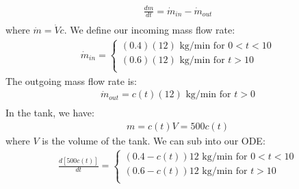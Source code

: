 \begin{exmp}{}
\begin{itemize}
\begin{align*}
 \frac{dm}{dt}=\dot{m}_{in}-\dot{m}_{out} \\ 
 \end{align*}
where $\dot{m}=\dot{V}c$. We define our incoming mass flow rate:
 \begin{align*}
 \dot{m}_{in}=
 \begin{cases}
 (0.4)(12) \text{ kg/min for }0<t<10\\
  (0.6)(12) \text{ kg/min for }t>10\\
 \end{cases}
\end{align*}
The outgoing mass flow rate is:
 \begin{align*}
 \dot{m}_{out}= c(t)(12) \text{ kg/min for } t>0\\
\end{align*}
In the tank, we have:
 \begin{align*}
m=c(t) V=500 c(t)
\end{align*}
where $V$ is the volume of the tank. We can sub into our ODE:
 \begin{align*}
 \frac{d [500 c(t)]}{dt}=
  \begin{cases}
 (0.4-c(t))12 \text{ kg/min for }0<t<10\\
  (0.6-c(t))12 \text{ kg/min for }t>10\\
 \end{cases}
 \end{align*}
 

\end{itemize}
\end{exmp}
